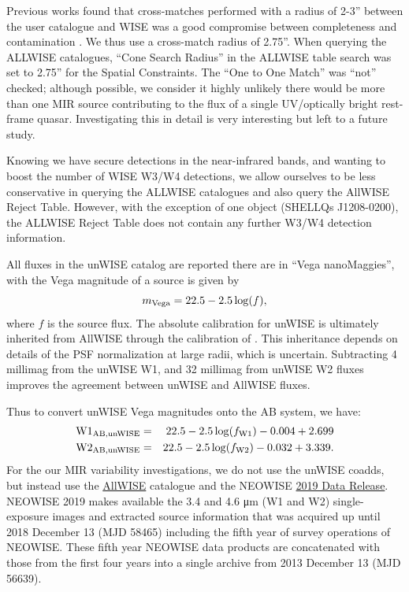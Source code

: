 \documentclass[usenatbib]{mnras}
\begin{document}
Previous works \citep[e.g., ][]{Krawczyk2013, Ross2015, Bilicki2016} found that cross-matches performed with a radius of 2-3'' between the user catalogue and WISE was a good compromise between completeness and contamination \citep[see e.g. Figure 4 of ][]{Krawczyk2013}. We thus use a cross-match radius of 2.75''. When querying the ALLWISE catalogues, ``Cone Search Radius'' in the ALLWISE table search was set to 2.75'' for the Spatial Constraints. The ``One to One Match'' was ``not'' checked; although possible, we consider it highly unlikely there would be more than one MIR source contributing to the flux of a single UV/optically bright rest-frame quasar. Investigating this in detail is very interesting but left to a future study. 

Knowing we have secure detections in the near-infrared bands, and wanting to boost the number of WISE W3/W4 detections, we allow ourselves to be less conservative in querying the ALLWISE catalogues and also query the AllWISE Reject Table. However, with the exception of one object (SHELLQs  J1208-0200), the ALLWISE Reject Table does not contain any further W3/W4 detection information. 

All fluxes in the unWISE catalog are reported there are in ``Vega
nanoMaggies'', with the Vega magnitude of a source is given by
\begin{equation}
m_{\rm Vega} = 22.5 - 2.5\log(f),
\end{equation} 
where $f$ is the source flux. The absolute calibration for unWISE is
ultimately inherited from AllWISE through the calibration of
\citet{Meisner2017a}. This inheritance depends on details of the PSF
normalization at large radii, which is uncertain. Subtracting 4
millimag from the unWISE W1, and 32 millimag from unWISE W2 fluxes
improves the agreement between unWISE and AllWISE fluxes.

Thus to convert unWISE Vega magnitudes onto the AB system, we have:     
\begin{eqnarray*}
        {\rm W1}_{\rm AB, unWISE}  & = &   22.5 - 2.5 \log(f_{\rm W1}) - 0.004 + 2.699 \\
        {\rm W2}_{\rm AB, unWISE}  &  = &  22.5 - 2.5 \log(f_{\rm W2}) - 0.032 + 3.339. 
\end{eqnarray*}
For the our MIR variability investigations, we do not use the unWISE
coadds, but instead use the
\href{http://wise2.ipac.caltech.edu/docs/release/allwise/}{AllWISE}
catalogue and the NEOWISE
\href{http://wise2.ipac.caltech.edu/docs/release/neowise/}{2019 Data
Release}. NEOWISE 2019 makes available the 3.4 and 4.6 μm (W1 and W2)
single-exposure images and extracted source information that was
acquired up until 2018 December 13 (MJD 58465) including the fifth
year of survey operations of NEOWISE. These fifth year NEOWISE data
products are concatenated with those from the first four years into a
single archive from 2013 December 13 (MJD 56639).
\end{document}
